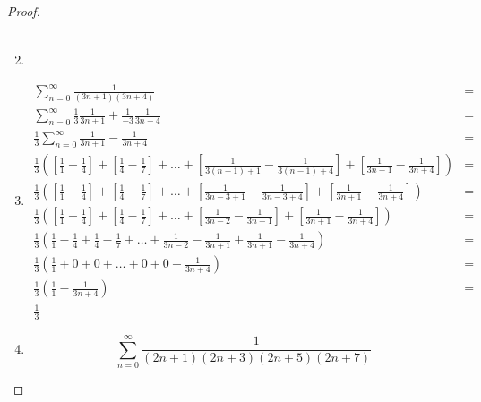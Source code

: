 \documentclass{../problemset}
\begin{document}
\begin{problem}
\begin{proof}
\begin{enumerate}
\begin{align}
		      \end{align}
		\item
		\item \begin{align*}
			      \sum_{n=0}^{\infty} \frac{1}{(3n + 1)(3n + 4)}                                                                                                                                                                                 & = \\
			      \sum_{n=0}^{\infty} \frac{1}{3}\frac{1}{3n + 1} + \frac{1}{-3}\frac{1}{3n + 4}                                                                                                                                                 & = \\
			      \frac{1}{3} \sum_{n=0}^{\infty} \frac{1}{3n + 1} - \frac{1}{3n + 4}                                                                                                                                                            & = \\
			      \frac{1}{3} \left(\left[\frac{1}{1} - \frac{1}{4}\right] + \left[\frac{1}{4} - \frac{1}{7}\right] + \ldots + \left[\frac{1}{3(n-1) + 1} - \frac{1}{3(n-1) +4}\right] + \left[\frac{1}{3n + 1} - \frac{1}{3n +4}\right] \right) & = \\
			      \frac{1}{3} \left(\left[\frac{1}{1} - \frac{1}{4}\right] + \left[\frac{1}{4} - \frac{1}{7}\right] + \ldots + \left[\frac{1}{3n -3 + 1} - \frac{1}{3n -3 + 4}\right] + \left[\frac{1}{3n + 1} - \frac{1}{3n +4}\right] \right)  & = \\
			      \frac{1}{3} \left(\left[\frac{1}{1} - \frac{1}{4}\right] + \left[\frac{1}{4} - \frac{1}{7}\right] + \ldots + \left[\frac{1}{3n - 2} - \frac{1}{3n + 1}\right] + \left[\frac{1}{3n + 1} - \frac{1}{3n +4}\right] \right)        & = \\
			      \frac{1}{3} \left(\frac{1}{1} - \frac{1}{4} + \frac{1}{4} - \frac{1}{7} + \ldots + \frac{1}{3n - 2} - \frac{1}{3n + 1} + \frac{1}{3n + 1} - \frac{1}{3n +4} \right)                                                            & = \\
			      \frac{1}{3} \left(\frac{1}{1} + 0 + 0 + \ldots + 0 + 0 - \frac{1}{3n +4} \right)                                                                                                                                               & = \\
			      \frac{1}{3} \left(\frac{1}{1} - \frac{1}{3n +4} \right)                                                                                                                                                                        & = \\
			      \frac{1}{3}
		      \end{align*}
		\item \[
			      \sum_{n=0}^{\infty} \frac{1}{(2n+1)(2n+3)(2n+5)(2n+7)}
		      \]
	\end{enumerate}
\end{proof}
\end{problem}
\end{document}
